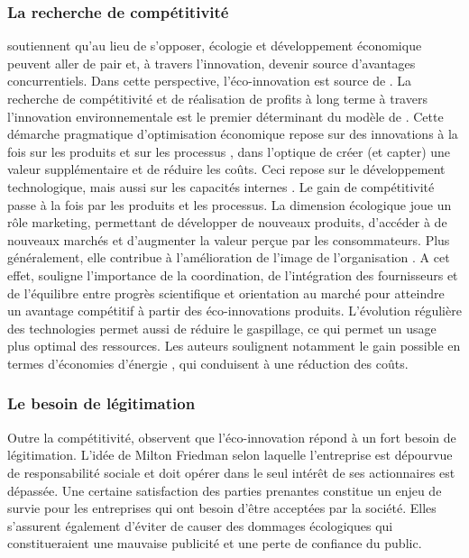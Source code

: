         \subsubsection{La recherche de compétitivité}

            \textcite{porter1995toward} soutiennent qu'au lieu de s'opposer, écologie et développement économique peuvent aller de pair et, à travers l'innovation, devenir source d'avantages concurrentiels. Dans cette perspective, l'éco-innovation est source de  \parencite{porter2011creating}. La recherche de compétitivité et de réalisation de profits à long terme à travers l'innovation environnementale est le premier déterminant du modèle de \textcite{bansal2000why}. Cette démarche pragmatique d'optimisation économique repose sur des innovations à la fois sur les produits et sur les processus \parencite{triguero2013drivers}, dans l'optique de créer (et capter) une valeur supplémentaire et de réduire les coûts. Ceci repose sur le développement technologique, mais aussi sur les capacités internes \parencite[\textit{technology-push,}][]{rennings2000redefining}. Le gain de compétitivité passe à la fois par les produits et les processus. La dimension écologique joue un rôle marketing, permettant de développer de nouveaux produits, d'accéder à de nouveaux marchés et d'augmenter la valeur perçue par les consommateurs. Plus généralement, elle contribue à l'amélioration de l'image de l'organisation \parencite{triguero2013drivers, rennings2000redefining}. A cet effet, \textcite{pujari2006eco-innovation} souligne l'importance de la coordination, de l'intégration des fournisseurs et de l'équilibre entre progrès scientifique et orientation au marché pour atteindre un avantage compétitif à partir des éco-innovations produits. L'évolution régulière des technologies permet aussi de réduire le gaspillage, ce qui permet un usage plus optimal des ressources. Les auteurs soulignent notamment le gain possible en termes d'économies d'énergie \parencite{porter2011creating, dangelico2010mainstreaming}, qui conduisent à une réduction des coûts.

        \subsubsection{Le besoin de légitimation}

            Outre la compétitivité, \textcite{bansal2000why} observent que l'éco-innovation répond à un fort besoin de légitimation. L'idée de Milton Friedman selon laquelle l'entreprise est dépourvue de responsabilité sociale et doit opérer dans le seul intérêt de ses actionnaires \parencite{porter2011creating} est dépassée. Une certaine satisfaction des parties prenantes constitue un enjeu de survie pour les entreprises qui ont besoin d'être acceptées par la société. Elles s'assurent également d'éviter de causer des dommages écologiques qui constitueraient une mauvaise publicité et une perte de confiance du public.

